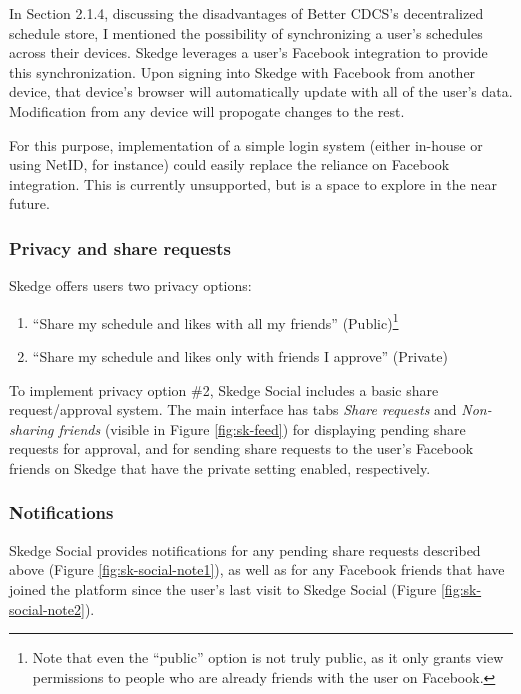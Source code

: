   In Section 2.1.4, discussing the disadvantages of Better CDCS's decentralized schedule store, I mentioned the possibility of synchronizing a user's schedules across their devices. Skedge leverages a user's Facebook integration to provide this synchronization. Upon signing into Skedge with Facebook from another device, that device's browser will automatically update with all of the user's data. Modification from any device will propogate changes to the rest.

  For this purpose, implementation of a simple login system (either in-house or using NetID, for instance) could easily replace the reliance on Facebook integration. This is currently unsupported, but is a space to explore in the near future.

  \subsubsection{Privacy and share requests}

  Skedge offers users two privacy options:

  \begin{enumerate}
  \item ``Share my schedule and likes with all my friends'' (Public)\footnote{Note that even the ``public'' option is not truly public, as it only grants view permissions to people who are already friends with the user on Facebook.}
  \item ``Share my schedule and likes only with friends I approve'' (Private)
  \end{enumerate}

  \noindent To implement privacy option \#2, Skedge Social includes a basic share request/approval system. The main interface has tabs \emph{Share requests} and \emph{Non-sharing friends} (visible in Figure \ref{fig:sk-feed}) for displaying pending share requests for approval, and for sending share requests to the user's Facebook friends on Skedge that have the private setting enabled, respectively.

  \subsubsection{Notifications}

  Skedge Social provides notifications for any pending share requests described above (Figure \ref{fig:sk-social-note1}), as well as for any Facebook friends that have joined the platform since the user's last visit to Skedge Social (Figure \ref{fig:sk-social-note2}). 

